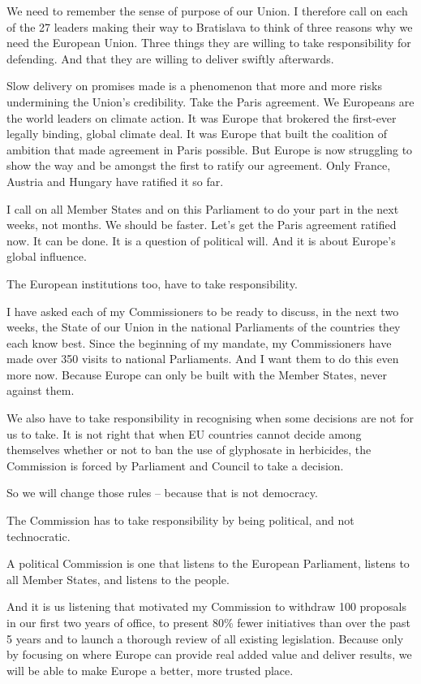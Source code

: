 \documentclass[a4paper,11pt]{article}
\begin{document}
We need to remember the sense of purpose of our Union. I therefore call on each of the 27 leaders making their way to Bratislava to think of three reasons why we need the European Union. Three things they are willing to take responsibility for defending. And that they are willing to deliver swiftly afterwards.

Slow delivery on promises made is a phenomenon that more and more risks undermining the Union's credibility. Take the Paris agreement. We Europeans are the world leaders on climate action. It was Europe that brokered the first-ever legally binding, global climate deal. It was Europe that built the coalition of ambition that made agreement in Paris possible. But Europe is now struggling to show the way and be amongst the first to ratify our agreement. Only France, Austria and Hungary have ratified it so far.

I call on all Member States and on this Parliament to do your part in the next weeks, not months. We should be faster. Let's get the Paris agreement ratified now. It can be done. It is a question of political will. And it is about Europe's global influence.

The European institutions too, have to take responsibility.

I have asked each of my Commissioners to be ready to discuss, in the next two weeks, the State of our Union in the national Parliaments of the countries they each know best. Since the beginning of my mandate, my Commissioners have made over 350 visits to national Parliaments. And I want them to do this even more now. Because Europe can only be built with the Member States, never against them.

We also have to take responsibility in recognising when some decisions are not for us to take. It is not right that when EU countries cannot decide among themselves whether or not to ban the use of glyphosate in herbicides, the Commission is forced by Parliament and Council to take a decision.

So we will change those rules – because that is not democracy.

The Commission has to take responsibility by being political, and not technocratic.

A political Commission is one that listens to the European Parliament, listens to all Member States, and listens to the people.

And it is us listening that motivated my Commission to withdraw 100 proposals in our first two years of office, to present 80\% fewer initiatives than over the past 5 years and to launch a thorough review of all existing legislation. Because only by focusing on where Europe can provide real added value and deliver results, we will be able to make Europe a better, more trusted place.
\end{document}
